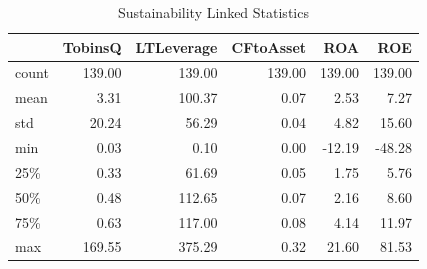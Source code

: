 \documentclass[12pt, a4paper]{article}
\begin{document}
\begin{table}[h]
\centering
\caption{Sustainability Linked Statistics}
\begin{tabular}{lrrrrr}
\hline
 & TobinsQ & LTLeverage & CFtoAsset & ROA & ROE \\
\hline
count & 139.00 & 139.00 & 139.00 & 139.00 & 139.00 \\
mean & 3.31 & 100.37 & 0.07 & 2.53 & 7.27 \\
std & 20.24 & 56.29 & 0.04 & 4.82 & 15.60 \\
min & 0.03 & 0.10 & 0.00 & -12.19 & -48.28 \\
25\% & 0.33 & 61.69 & 0.05 & 1.75 & 5.76 \\
50\% & 0.48 & 112.65 & 0.07 & 2.16 & 8.60 \\
75\% & 0.63 & 117.00 & 0.08 & 4.14 & 11.97 \\
max & 169.55 & 375.29 & 0.32 & 21.60 & 81.53 \\
\hline
\end{tabular}
\label{table:6}
\end{table}

\clearpage
\end{document}
